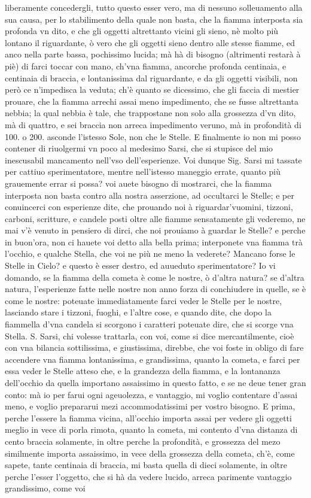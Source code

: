 \documentclass[11pt,twoside,openany]{book}
\begin{document}
liberamente concedergli, tutto questo esser vero, ma di nessuno solleuamento alla sua causa, per lo stabilimento della quale non basta, che la fiamma interposta sia profonda vn dito, e che gli oggetti altrettanto vicini gli sieno, nè molto più lontano il riguardante, ò vero che gli oggetti sieno dentro alle stesse fiamme, ed anco nella parte bassa, pochissimo lucida; mà hà di bisogno (altrimenti restarà à piè) di farci toccar con mano, ch'vna fiamma, ancorche profonda centinaia, e centinaia di braccia, e lontanissima dal riguardante, e da gli oggetti visibili, non però ce n'impedisca la veduta; ch'è quanto se dicessimo, che gli faccia di mestier prouare, che la fiamma arrechi assai meno impedimento, che se fusse altrettanta nebbia; la qual nebbia è tale, che trappostane non solo alla grossezza d'vn dito, mà di quattro, e sei braccia non arreca impedimento veruno, mà in profondità di 100. o 200. asconde l'istesso Sole, non che le Stelle. E finalmente io non mi posso contener di riuolgermi vn poco al medesimo Sarsi, che si stupisce del mio inescusabil mancamento nell'vso dell'esperienze. Voi dunque Sig. Sarsi mi tassate per cattiuo sperimentatore, mentre nell'istesso maneggio errate, quanto più grauemente errar si possa? voi auete bisogno di mostrarci, che la fiamma interposta non basta contro alla nostra asserzione, ad occultarci le Stelle; e per conuincerci con esperienze dite, che prouando noi à riguardar'vuomini, tizzoni, carboni, scritture, e candele posti oltre alle fiamme sensatamente gli vederemo, ne mai v'è venuto in pensiero di dirci, che noi prouiamo à guardar le Stelle? e perche in buon'ora, non ci hauete voi detto alla bella prima; interponete vna fiamma trà l'occhio, e qualche Stella, che voi ne più ne meno la vederete? Mancano forse le Stelle in Cielo? e questo è esser destro, ed auueduto sperimentatore? Io vi domando, se la fiamma della cometa è come le nostre, ò d'altra natura? se d'altra natura, l'esperienze fatte nelle nostre non anno forza di conchiudere in quelle, se è come le nostre: poteuate immediatamente farci veder le Stelle per le nostre, lasciando stare i tizzoni, fuoghi, e l'altre cose, e quando dite, che dopo la fiammella d'vna candela si scorgono i caratteri poteuate dire, che si scorge vna Stella. S. Sarsi, chi volesse trattarla, con voi, come si dice mercantilmente, cioè con vna bilancia sottilissima, e giustissima, direbbe, che voi foste in obligo di fare accendere vna fiamma lontanissima, e grandissima, quanto la cometa, e farci per essa veder le Stelle atteso che, e la grandezza della fiamma, e la lontananza dell'occhio da quella importano assaissimo in questo fatto, e se ne deue tener gran conto: mà io per farui ogni ageuolezza, e vantaggio, mi voglio contentare d'assai meno, e voglio prepararui mezi accommodatissimi per vostro bisogno. E prima, perche l'essere la fiamma vicina, all'occhio importa assai per vedere gli oggetti meglio in vece di porla rimota, quanto la cometa, mi contento d'vna distanza di cento braccia solamente, in oltre perche la profondità, e grossezza del mezo similmente importa assaissimo, in vece della grossezza della cometa, ch'è, come sapete, tante centinaia di braccia, mi basta quella di dieci solamente, in oltre perche l'esser l'oggetto, che si hà da vedere lucido, arreca parimente vantaggio grandissimo, come voi 
\end{document}
